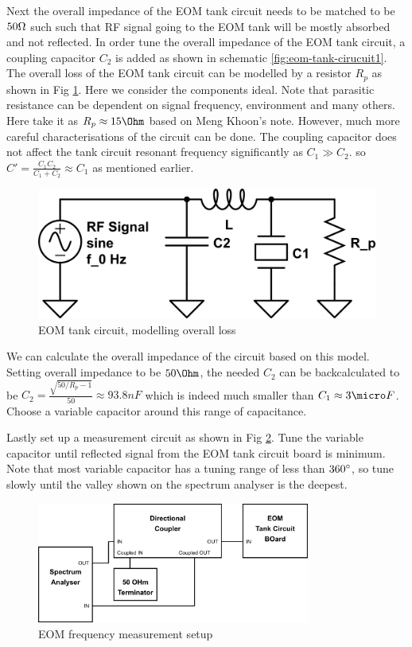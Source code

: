 \documentclass[11pt,A4Paper]{article}
\begin{document}
\par
Next the overall impedance of the EOM tank circuit needs to be matched to be $50\ohm$ such such that RF signal going to the EOM tank will be mostly absorbed and not reflected. In order tune the overall impedance of the EOM tank circuit, a coupling capacitor $C_2$ is added as shown in schematic \ref{fig:eom-tank-cirucuit1}. The overall loss of the EOM tank circuit can be modelled by a resistor $R_p$ as shown in Fig \ref{fig:eom-tank-cirucuit2}. Here we consider the components ideal. Note that parasitic resistance can be dependent on signal frequency, environment and many others. Here take it as $ R_p \approx 15 \Ohm$ based on Meng Khoon's note. However, much more careful characterisations of the circuit can be done. The coupling capacitor does not affect the tank circuit resonant frequency significantly as $C_1 \gg C_2$. so $C' = \frac{C_1C_2}{C_1+C_2} \approx C_1$ as mentioned earlier.  

\begin{figure}[H]
    \centering
    \includegraphics[width=.8\textwidth]{eom-tank-cirucuit2.png}
    \caption{EOM tank circuit, modelling overall loss}
    \label{fig:eom-tank-cirucuit2}
\end{figure}

We can calculate the overall impedance of the circuit based on this model. Setting overall impedance to be $50\Ohm$, the needed $C_2$ can be backcalculated to be $C_2 = \frac{\sqrt{50/R_p -1}}{50} \approx 93.8 nF$ which is indeed much smaller than $C_1 \approx 3 \micro F$. Choose a variable capacitor around this range of capacitance. 
\par
Lastly set up a measurement circuit as shown in Fig \ref{fig:eom-freq-measurement-setup.png}. Tune the variable capacitor until reflected signal from the EOM tank circuit board is minimum. Note that most variable capacitor has a tuning range of less than $360\degree$, so tune slowly until the valley shown on the spectrum analyser is the deepest. 

\begin{figure}[H]
    \centering
    \includegraphics[width=0.8\textwidth]{eom-freq-measurement-setup.png}
    \caption{EOM frequency measurement setup}
    \label{fig:eom-freq-measurement-setup.png}
\end{figure}
\end{document}

